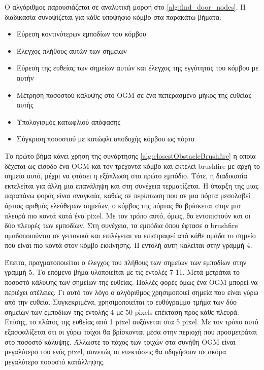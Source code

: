 \medskip
Ο αλγόριθμος παρουσιάζεται σε αναλυτική μορφή στο \ref{alg:find_door_nodes}. Η διαδικασία συνοψίζεται για κάθε υποψήφιο κόμβο στα παρακάτω βήματα:
\begin{itemize}
    \setlength\itemsep{-0.2em}
    \item Εύρεση κοντινότερων εμποδίων του κόμβου
    \item Έλεγχος πλήθους αυτών των σημείων
    \item Εύρεση της ευθείας των σημείων αυτών και έλεγχος της εγγύτητας του κόμβου με αυτήν
    \item Μέτρηση ποσοστού κάλυψης στο OGM σε ένα πεπερασμένο μήκος της ευθείας αυτής
    \item Υπολογισμός κατωφλιού απόφασης
    \item Σύγκριση ποσοστού με κατώφλι αποδοχής κόμβου ως πόρτα
\end{itemize}


Το πρώτο βήμα κάνει χρήση της συνάρτησης \ref{alg:closestObstacleBrushfire} η οποία δέχεται ως είσοδο ένα OGM και τον τρέχοντα κόμβο και εκτελεί brushfire με αρχή το σημείο αυτό, μέχρι να φτάσει η εξάπλωση στο πρώτο εμπόδιο. Τότε, η διαδικασία εκτελείται για άλλη μια επανάληψη και στη συνέχεια τερματίζεται. Η ύπαρξη της μιας παραπάνω φοράς είναι αναγκαία, καθώς σε περίπτωση που σε μια πόρτα μεσολαβεί άρτιος αριθμός ελεύθερων σημείων, ο κόμβος της πόρτας θα βρίσκεται στην μια πλευρά πιο κοντά κατά ένα pixel. Με τον τρόπο αυτό, όμως, θα εντοπιστούν και οι δύο πλευρές των εμποδίων. Στη συνέχεια, τα εμπόδια όπου έφτασε ο brushfire ομαδοποιούνται σε γειτονικά και επιλέγεται να επιστραφεί από κάθε ομάδα το σημείο που είναι πιο κοντά στον κόμβο εκκίνησης. Η εντολή αυτή καλείται στην γραμμή 4. 

Έπειτα, πραγματοποιείται ο έλεγχος του πλήθους των σημείων των εμποδίων στην γραμμή 5. Το επόμενο βήμα υλοποιείται με τις εντολές 7-11. Μετά μετράται το ποσοστό κάλυψης των σημείων της ευθείας. Πολλές φορές όμως ένα OGM μπορεί να περιέχει ατέλειες. Γι αυτό τον λόγο ο αλγόριθμος χρησιμοποιεί σημεία που είναι γύρω από την ευθεία. Συγκεκριμένα, χρησιμοποιείται το ευθύγραμμο τμήμα των δύο σημείων των εμποδίων της εντολής 4 με 50 pixels επέκταση προς κάθε πλευρά. Επίσης, το πλάτος της ευθείας από 1 pixel αυξάνεται στα 5 pixel. Με τον τρόπο αυτό εξασφαλίζεται ότι οι γύρω τοίχοι θα βρίσκονται μέσα στην περιοχή που προσμετράται στο ποσοστό κάλυψης. Άλλωστε το πάχος των τοιχών στα συνήθη OGM είναι μεγαλύτερο του ενός pixel, συνεπώς οι επεκτάσεις θα οδηγήσουν σε ακόμα μεγαλύτερο ποσοστό κατάλληψης.

